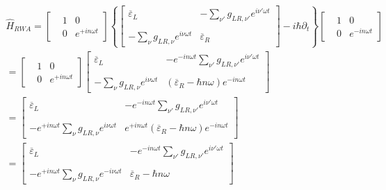 \begin{multline*}
\widehat{H}_{RWA}=\begin{bmatrix}
 & 1 & 0 
\\
& 0 & e^{+in\omega t}
\end{bmatrix}
\left\lbrace  \begin{bmatrix}
\overline{\varepsilon}_{L}
& -\sum_{\nu'}{g_{LR,\nu'} } e^{ i \nu'\omega t }
 \\ 
 \\
-\sum_{\nu}{g_{LR,\nu} } e^{  i \nu\omega t } 
& \overline{\varepsilon}_{R}
\end{bmatrix} 
-i\hbar\partial_t \right\rbrace 
\begin{bmatrix}
 & 1 & 0 
\\
& 0 & e^{-in\omega t}
\end{bmatrix}
\\
=\begin{bmatrix}
 & 1 & 0 
\\
& 0 & e^{+in\omega t}
\end{bmatrix}
\begin{bmatrix}
\overline{\varepsilon}_{L}
& -e^{ - i n \omega t } \sum_{\nu'}{g_{LR,\nu'} } e^{ i \nu'\omega t }
 \\ 
 \\
-\sum_{\nu}{g_{LR,\nu} } e^{  i \nu\omega t } 
& (\overline{\varepsilon}_{R}-\hbar n \omega)e^{ - i n \omega t }
\end{bmatrix} 
\\
=\begin{bmatrix}
\overline{\varepsilon}_{L}
& -e^{ - i n \omega t } \sum_{\nu'}{g_{LR,\nu'} } e^{ i \nu'\omega t }
 \\ 
 \\
-e^{ + i n \omega t } \sum_{\nu}{g_{LR,\nu} } e^{  i \nu\omega t } 
& e^{ + i n \omega t } (\overline{\varepsilon}_{R}-\hbar n \omega)e^{ - i n \omega t }
\end{bmatrix} 
\\
=\begin{bmatrix}
\overline{\varepsilon}_{L}
& -e^{ - i n \omega t } \sum_{\nu'}{g_{LR,\nu'} } e^{ i \nu'\omega t }
 \\ 
 \\
-e^{ + i n \omega t } \sum_{\nu}{g_{LR,\nu} } e^{ - i \nu\omega t } 
& \overline{\varepsilon}_{R}-\hbar n \omega
\end{bmatrix} 
\end{multline*}

